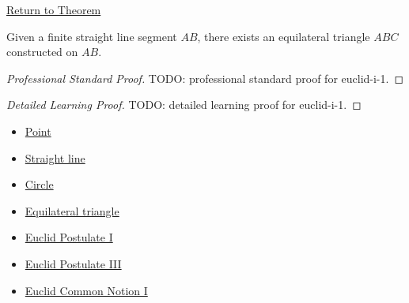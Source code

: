 \newpage
{}
\label{prf:euclid-i-1}

\begin{remark*}[Return]
\hyperref[thm:euclid-i-1]{Return to Theorem}
\end{remark*}

\begin{theorem*}
Given a finite straight line segment $AB$, there exists an equilateral
triangle $ABC$ constructed on $AB$.
\end{theorem*}

\begin{proof}[Professional Standard Proof]
\LRAProofBodyStart
TODO: professional standard proof for euclid-i-1.
\end{proof}

\begin{proof}[Detailed Learning Proof]
\LRAProofBodyStart
TODO: detailed learning proof for euclid-i-1.
\end{proof}

\begin{remark*}
\end{remark*}

\begin{dependencies}
\begin{itemize}
  \item \hyperref[def:euclid-point]{Point}
  \item \hyperref[def:euclid-straight-line]{Straight line}
  \item \hyperref[def:euclid-circle]{Circle}
  \item \hyperref[def:euclid-triangle-side-classes]{Equilateral triangle}
  \item \hyperref[ax:euclid-postulate-draw-straight-line]{Euclid Postulate I}
  \item \hyperref[ax:euclid-postulate-describe-circle]{Euclid Postulate III}
  \item \hyperref[ax:euclid-common-notion-things-equal-to-same]{Euclid Common Notion I}
\end{itemize}
\end{dependencies}

\clearpage
